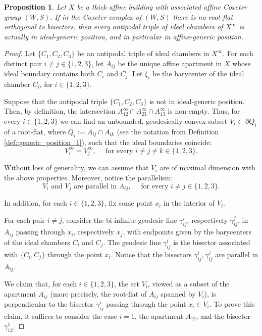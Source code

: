 \documentclass[11pt]{amsart}
\theoremstyle{plain}
\newtheorem{prop}[thm]{Proposition}
\theoremstyle{definition}
\theoremstyle{remark}
\begin{document}
	
	
	
	\begin{prop}\label{prop antipodal non generic case}
		Let $X$ be a thick affine building with associated affine Coxeter group $(W,S)$. If in the Coxeter complex of $(W,S)$ there is no root-flat orthogonal to bisectors, then every antipodal triple of ideal chambers of $X^\infty$ is actually in ideal-generic position, and in particular in affine-generic position. 
	\end{prop}
	
	\begin{proof}
		Let $\{C_1, C_2, C_3\}$ be an antipodal triple of ideal chambers in $X^{\infty}$.  For each distinct pair $i \neq j \in \{1,2,3\}$, let $A_{ij}$ be the unique affine apartment in $X$ whose ideal boundary contains both $C_i$ and $C_j$.  Let $\xi_i$ be the barycenter of the ideal chamber $C_i$, for $i \in \{1,2,3\}$.
		
		Suppose that the antipodal triple $\{C_1, C_2, C_3\}$ is not in ideal-generic position. Then, by definition, the intersection $A_{12}^{\infty} \cap A_{23}^{\infty} \cap A_{13}^{\infty}$ is non-empty. Thus, for every $i \in \{1,2,3\}$ we can find an unbounded,  geodesically convex subset  $V_{i} \subset \partial Q_i$ of a root-flat, where $Q_i := A_{ij} \cap A_{ik}$ (see the notation from Definition \ref{def::generic_position_1}), such that the ideal boundaries coincide:
		$$V_{i}^{\infty}= V_{j}^{\infty}, \quad \text{ for every } i \neq j \neq k \in \{1,2,3\}.$$ 
		
		Without loss of generality, we can assume that $V_i$ are of maximal dimension with the above properties. Moreover, notice the parallelism: 
		$$V_i  \text{ and } V_j \text{ are parallel in } A_{ij}, \quad  \text{ for every } i\neq j \in \{1,2,3\}.$$ 
		
		In addition, for each $i \in \{1,2,3\}$, fix some point $x_i $ in the interior of $V_i$. 	 
		
		For each pair $i \neq j$, consider the bi-infinite geodesic line $\gamma^{i}_{ij}$, respectively  $\gamma^{j}_{ij}$, in $A_{ij}$ passing through $x_i$, respectively $x_j$, with endpoints given by the barycenters of the ideal chambers $C_i$ and $C_j$. The geodesic line $\gamma^{i}_{ij}$ is  the bisector associated with $\{C_i, C_j\}$ through the point $x_i$. Notice that the bisectors $\gamma^{i}_{ij}, \gamma^{j}_{ij}$ are parallel in $A_{ij}$.
		
		We claim that, for each $i \in \{1,2,3\}$, the set $V_i$, viewed as a subset of the apartment $A_{ij}$ (more precisely, the root-flat of
		$A_{ij}$ spanned by $V_i$), is perpendicular to the bisector $\gamma^{i}_{ij}$ passing through the point $x_i \in V_i$. To prove this
		claim, it suffices to consider the case $i=1$, the apartment $A_{12}$, and the bisector $\gamma^{1}_{12}$.
		

\end{proof}
\end{document}
